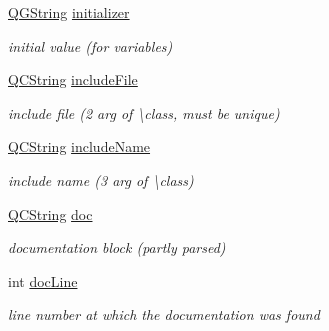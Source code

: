\begin{DoxyCompactItemize}
\mbox{\label{class_entry_a2a0c9e7ce364ed2981f49314c33245f9}} 
\mbox{\hyperlink{class_q_g_string}{Q\+G\+String}} \mbox{\hyperlink{class_entry_a2a0c9e7ce364ed2981f49314c33245f9}{initializer}}
\begin{DoxyCompactList}\small\item\em initial value (for variables) \end{DoxyCompactList}\item 
\mbox{\label{class_entry_a88c55fcdd65a52dce640136f18adccf2}} 
\mbox{\hyperlink{class_q_c_string}{Q\+C\+String}} \mbox{\hyperlink{class_entry_a88c55fcdd65a52dce640136f18adccf2}{include\+File}}
\begin{DoxyCompactList}\small\item\em include file (2 arg of \textbackslash{}class, must be unique) \end{DoxyCompactList}\item 
\mbox{\label{class_entry_a32626ce14eb253f6da64ed475419a4ac}} 
\mbox{\hyperlink{class_q_c_string}{Q\+C\+String}} \mbox{\hyperlink{class_entry_a32626ce14eb253f6da64ed475419a4ac}{include\+Name}}
\begin{DoxyCompactList}\small\item\em include name (3 arg of \textbackslash{}class) \end{DoxyCompactList}\item 
\mbox{\label{class_entry_ac02a6c1dd922221351f6de0286d48d77}} 
\mbox{\hyperlink{class_q_c_string}{Q\+C\+String}} \mbox{\hyperlink{class_entry_ac02a6c1dd922221351f6de0286d48d77}{doc}}
\begin{DoxyCompactList}\small\item\em documentation block (partly parsed) \end{DoxyCompactList}\item 
\mbox{\label{class_entry_a180b5fdd7f3b963e4b0d2c4ea6e0b1b5}} 
int \mbox{\hyperlink{class_entry_a180b5fdd7f3b963e4b0d2c4ea6e0b1b5}{doc\+Line}}
\begin{DoxyCompactList}\small\item\em line number at which the documentation was found \end{DoxyCompactList}\item 
\mbox{\label{class_entry_ac6841c6ec8fd7ae6121364e7e1895e94}} 

\end{DoxyCompactItemize}
